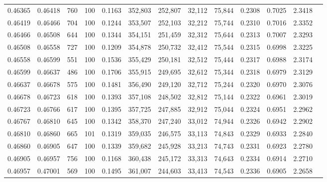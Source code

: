 \begin{tabular}{rrrrrrrrrrrrr}
0.46365 & 0.46418 &   760 & 100 &                                     0.1163 & 352,803 & 252,807 &  32,112 &  75,844 & 0.2308 & 0.7025 & 2.3418 \\
0.46419 & 0.46466 &   704 & 100 &                                     0.1244 & 353,507 & 252,103 &  32,212 &  75,744 & 0.2310 & 0.7016 & 2.3352 \\
0.46466 & 0.46508 &   644 & 100 &                                     0.1344 & 354,151 & 251,459 &  32,312 &  75,644 & 0.2313 & 0.7007 & 2.3293 \\
0.46508 & 0.46558 &   727 & 100 &                                     0.1209 & 354,878 & 250,732 &  32,412 &  75,544 & 0.2315 & 0.6998 & 2.3225 \\
0.46558 & 0.46599 &   551 & 100 &                                     0.1536 & 355,429 & 250,181 &  32,512 &  75,444 & 0.2317 & 0.6988 & 2.3174 \\
0.46599 & 0.46637 &   486 & 100 &                                     0.1706 & 355,915 & 249,695 &  32,612 &  75,344 & 0.2318 & 0.6979 & 2.3129 \\
0.46637 & 0.46678 &   575 & 100 &                                     0.1481 & 356,490 & 249,120 &  32,712 &  75,244 & 0.2320 & 0.6970 & 2.3076 \\
0.46678 & 0.46723 &   618 & 100 &                                     0.1393 & 357,108 & 248,502 &  32,812 &  75,144 & 0.2322 & 0.6961 & 2.3019 \\
0.46723 & 0.46766 &   617 & 100 &                                     0.1395 & 357,725 & 247,885 &  32,912 &  75,044 & 0.2324 & 0.6951 & 2.2962 \\
0.46767 & 0.46810 &   645 & 100 &                                     0.1342 & 358,370 & 247,240 &  33,012 &  74,944 & 0.2326 & 0.6942 & 2.2902 \\
0.46810 & 0.46860 &   665 & 101 &                                     0.1319 & 359,035 & 246,575 &  33,113 &  74,843 & 0.2329 & 0.6933 & 2.2840 \\
0.46860 & 0.46905 &   647 & 100 &                                     0.1339 & 359,682 & 245,928 &  33,213 &  74,743 & 0.2331 & 0.6923 & 2.2780 \\
0.46905 & 0.46957 &   756 & 100 &                                     0.1168 & 360,438 & 245,172 &  33,313 &  74,643 & 0.2334 & 0.6914 & 2.2710 \\
0.46957 & 0.47001 &   569 & 100 &                                     0.1495 & 361,007 & 244,603 &  33,413 &  74,543 & 0.2336 & 0.6905 & 2.2658 \\

\end{tabular}
